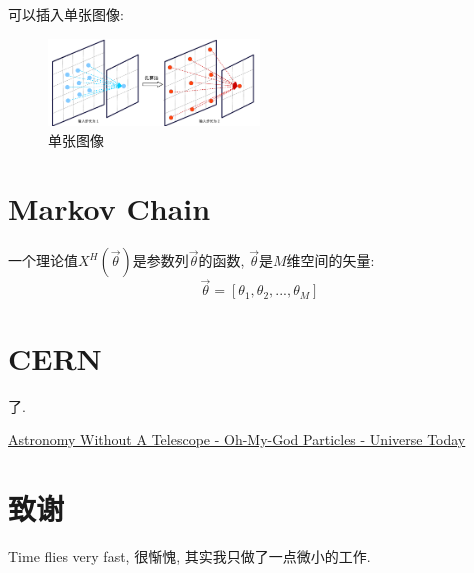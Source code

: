\documentclass[a4paper]{article}
\begin{document}
\begin{spacing}{1.5}
可以插入单张图像:
\begin{figure}[h]
\centering
\includegraphics[width=0.5\textwidth]{images/Chap2/hole.pdf}
\caption{单张图像}
\label{fig:hole}
\end{figure}



\pagebreak[4]%
\appendix
\section{Markov Chain}
一个理论值$X^H(\vec{\theta})$是参数列$\vec{\theta}$的函数, $\vec{\theta}$是$M$维空间的矢量:
\begin{equation}
\vec{\theta}=[\theta_1, \theta_2, ..., \theta_M]
\end{equation}


\pagebreak[4]%


\section{CERN}
了.


\end{spacing}


\pagebreak[4]
\begin{thebibliography}{99}


 \href{https://www.universetoday.com/86490/astronomy-without-a-telescope-oh-my-god-particles/}{Astronomy Without A Telescope - Oh-My-God Particles - Universe Today}


\end{thebibliography}


\pagebreak[4]
\thispagestyle{empty}
\section*{致谢}
\begin{spacing}{1.5}
\songti
Time flies very fast, 很惭愧, 其实我只做了一点微小的工作.
\end{spacing}
\end{document}

